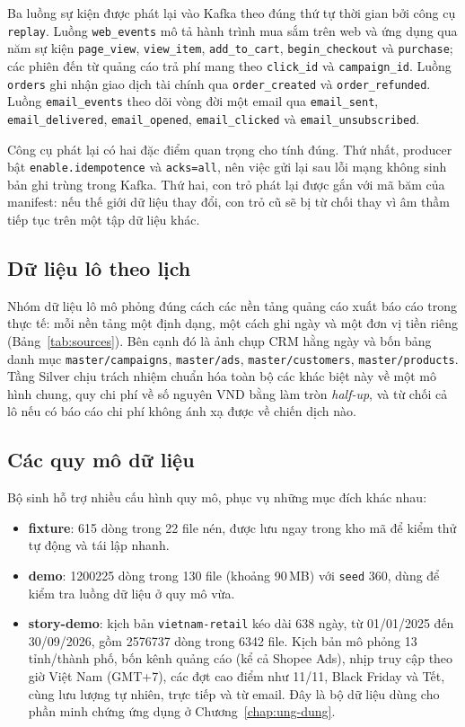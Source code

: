 Ba luồng sự kiện được phát lại vào Kafka theo đúng thứ tự thời gian bởi công cụ \texttt{replay}. Luồng \texttt{web\_events} mô tả hành trình mua sắm trên web và ứng dụng qua năm sự kiện \texttt{page\_view}, \texttt{view\_item}, \texttt{add\_to\_cart}, \texttt{begin\_checkout} và \texttt{purchase}; các phiên đến từ quảng cáo trả phí mang theo \texttt{click\_id} và \texttt{campaign\_id}. Luồng \texttt{orders} ghi nhận giao dịch tài chính qua \texttt{order\_created} và \texttt{order\_refunded}. Luồng \texttt{email\_events} theo dõi vòng đời một email qua \texttt{email\_sent}, \texttt{email\_delivered}, \texttt{email\_opened}, \texttt{email\_clicked} và \texttt{email\_unsubscribed}.

Công cụ phát lại có hai đặc điểm quan trọng cho tính đúng. Thứ nhất, producer bật \texttt{enable.idempotence} và \texttt{acks=all}, nên việc gửi lại sau lỗi mạng không sinh bản ghi trùng trong Kafka. Thứ hai, con trỏ phát lại được gắn với mã băm của manifest: nếu thế giới dữ liệu thay đổi, con trỏ cũ sẽ bị từ chối thay vì âm thầm tiếp tục trên một tập dữ liệu khác.

\subsection{Dữ liệu lô theo lịch}
\label{sec:c2-du-lieu-lo}

Nhóm dữ liệu lô mô phỏng đúng cách các nền tảng quảng cáo xuất báo cáo trong thực tế: mỗi nền tảng một định dạng, một cách ghi ngày và một đơn vị tiền riêng (Bảng~\ref{tab:sources}). Bên cạnh đó là ảnh chụp CRM hằng ngày và bốn bảng danh mục \texttt{master/campaigns}, \texttt{master/ads}, \texttt{master/customers}, \texttt{master/products}. Tầng Silver chịu trách nhiệm chuẩn hóa toàn bộ các khác biệt này về một mô hình chung, quy chi phí về số nguyên VND bằng làm tròn \emph{half-up}, và từ chối cả lô nếu có báo cáo chi phí không ánh xạ được về chiến dịch nào.

\subsection{Các quy mô dữ liệu}
\label{sec:c2-profiles}

Bộ sinh hỗ trợ nhiều cấu hình quy mô, phục vụ những mục đích khác nhau:

\begin{itemize}
    \item \textbf{fixture}: \num{615} dòng trong 22 file nén, được lưu ngay trong kho mã để kiểm thử tự động và tái lập nhanh.
    \item \textbf{demo}: \num{1200225} dòng trong 130 file (khoảng 90\,MB) với \texttt{seed} 360, dùng để kiểm tra luồng dữ liệu ở quy mô vừa.
    \item \textbf{story-demo}: kịch bản \texttt{vietnam-retail} kéo dài 638 ngày, từ 01/01/2025 đến 30/09/2026, gồm \num{2576737} dòng trong \num{6342} file. Kịch bản mô phỏng 13 tỉnh/thành phố, bốn kênh quảng cáo (kể cả Shopee Ads), nhịp truy cập theo giờ Việt Nam (GMT+7), các đợt cao điểm như 11/11, Black Friday và Tết, cùng lưu lượng tự nhiên, trực tiếp và từ email. Đây là bộ dữ liệu dùng cho phần minh chứng ứng dụng ở Chương~\ref{chap:ung-dung}.
\end{itemize}

